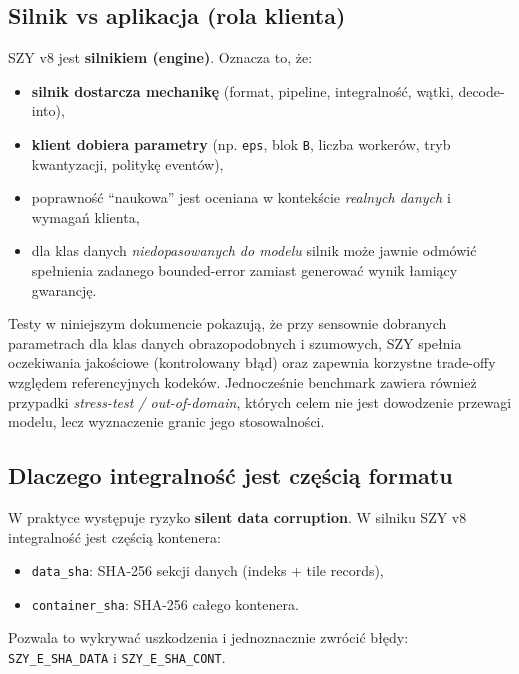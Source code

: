 \documentclass[11pt,a4paper]{article}
\begin{document}
\subsection{Silnik vs aplikacja (rola klienta)}
SZY v8 jest \textbf{silnikiem (engine)}. Oznacza to, że:
\begin{itemize}
  \item \textbf{silnik dostarcza mechanikę} (format, pipeline, integralność, wątki, decode-into),
  \item \textbf{klient dobiera parametry} (np. \texttt{eps}, blok \texttt{B}, liczba workerów, tryb kwantyzacji, politykę eventów),
  \item poprawność ``naukowa'' jest oceniana w kontekście \emph{realnych danych} i wymagań klienta,
  \item dla klas danych \emph{niedopasowanych do modelu} silnik może jawnie odmówić spełnienia zadanego bounded-error zamiast generować wynik łamiący gwarancję.
\end{itemize}
Testy w niniejszym dokumencie pokazują, że przy sensownie dobranych parametrach dla klas danych obrazopodobnych i szumowych, SZY spełnia oczekiwania jakościowe (kontrolowany błąd) oraz zapewnia korzystne trade-offy względem referencyjnych kodeków. Jednocześnie benchmark zawiera również przypadki \emph{stress-test / out-of-domain}, których celem nie jest dowodzenie przewagi modelu, lecz wyznaczenie granic jego stosowalności.

\subsection{Dlaczego integralność jest częścią formatu}
W praktyce występuje ryzyko \textbf{silent data corruption}. W silniku SZY v8 integralność jest częścią kontenera:
\begin{itemize}
  \item \texttt{data\_sha}: SHA-256 sekcji danych (indeks + tile records),
  \item \texttt{container\_sha}: SHA-256 całego kontenera.
\end{itemize}
Pozwala to wykrywać uszkodzenia i jednoznacznie zwrócić błędy:
\texttt{SZY\_E\_SHA\_DATA} i \texttt{SZY\_E\_SHA\_CONT}.

\end{document}

